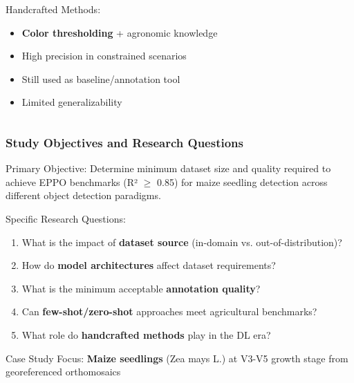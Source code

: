 \documentclass[aspectratio=43]{beamer}
\begin{document}
\begin{frame}
\begin{columns}
\begin{column}{0.5\textwidth}
            \begin{block}{Handcrafted Methods:}
                \small
                \begin{itemize}
                    \item \textbf{Color thresholding} + agronomic knowledge
                    \item High precision in constrained scenarios
                    \item Still used as baseline/annotation tool
                    \item Limited generalizability
                \end{itemize}
            \end{block}
        \end{column}
    \end{columns}
\end{frame}

\begin{frame}
    \frametitle{Study Objectives and Research Questions}
    
    \begin{exampleblock}{Primary Objective:}
        Determine minimum dataset size and quality required to achieve EPPO benchmarks (R² $\geq$ 0.85) for maize seedling detection across different object detection paradigms.
    \end{exampleblock}
    
    \begin{block}{Specific Research Questions:}
        \begin{enumerate}
            \item What is the impact of \textbf{dataset source} (in-domain vs. out-of-distribution)?
            \item How do \textbf{model architectures} affect dataset requirements?
            \item What is the minimum acceptable \textbf{annotation quality}?
            \item Can \textbf{few-shot/zero-shot} approaches meet agricultural benchmarks?
            \item What role do \textbf{handcrafted methods} play in the DL era?
        \end{enumerate}
    \end{block}
    
    \begin{alertblock}{Case Study Focus:}
        \textbf{Maize seedlings} (Zea mays L.) at V3-V5 growth stage from georeferenced orthomosaics
    \end{alertblock}
\end{frame}
\end{document}
